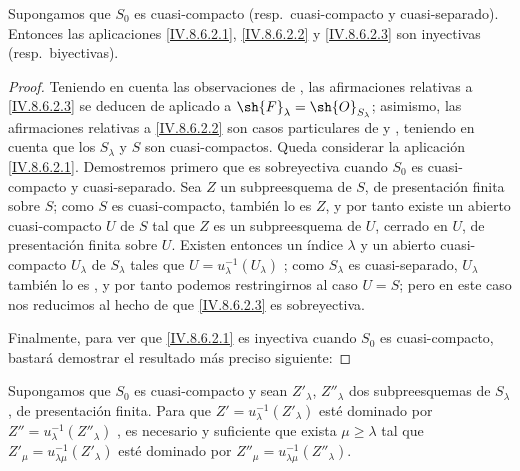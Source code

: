 \begin{proposition}[8.6.3]
\label{IV.8.6.3}
Supongamos que $S_0$ es cuasi-compacto (resp.\ cuasi-compacto y cuasi-separado).
Entonces las aplicaciones \eqref{IV.8.6.2.1}, \eqref{IV.8.6.2.2} y \eqref{IV.8.6.2.3} son inyectivas (resp.\ biyectivas).
\end{proposition}

\begin{proof}
Teniendo en cuenta las observaciones de , las afirmaciones relativas a \eqref{IV.8.6.2.3} se deducen de  aplicado a $\sh{F}_\lambda=\sh{O}_{S_\lambda}$; asimismo, las afirmaciones relativas a \eqref{IV.8.6.2.2} son casos particulares de  y , teniendo en cuenta que los $S_\lambda$ y $S$ son cuasi-compactos.
Queda considerar la aplicación \eqref{IV.8.6.2.1}.
Demostremos primero que es sobreyectiva cuando $S_0$ es cuasi-compacto y cuasi-separado.
Sea $Z$ un subpreesquema de $S$, de presentación finita sobre $S$; como $S$ es cuasi-compacto, también lo es $Z$, y por tanto existe un abierto cuasi-compacto $U$ de $S$ tal que $Z$ es un subpreesquema de $U$, cerrado en $U$, de presentación finita sobre $U$.
Existen entonces un índice $\lambda$ y un abierto cuasi-compacto $U_\lambda$ de $S_\lambda$ tales que $U=u_\lambda^{-1}(U_\lambda)$ ; como $S_\lambda$ es cuasi-separado, $U_\lambda$ también lo es , y por tanto podemos restringirnos al caso $U=S$; pero en este caso nos reducimos al hecho de que \eqref{IV.8.6.2.3} es sobreyectiva.

Finalmente, para ver que \eqref{IV.8.6.2.1} es inyectiva cuando $S_0$ es cuasi-compacto, bastará demostrar el resultado más preciso siguiente:
\end{proof}

\begin{corollary}[8.6.3.1]
\label{IV.8.6.3.1}
Supongamos que $S_0$ es cuasi-compacto y sean $Z'_\lambda$, $Z''_\lambda$ dos subpreesquemas de $S_\lambda$, de presentación finita.
Para que $Z'=u_\lambda^{-1}(Z'_\lambda)$ esté dominado por $Z''=u_\lambda^{-1}(Z''_\lambda)$ , es necesario y suficiente que exista $\mu\geqslant\lambda$ tal que $Z'_\mu=u_{\lambda\mu}^{-1}(Z'_\lambda)$ esté dominado por $Z''_\mu=u_{\lambda\mu}^{-1}(Z''_\lambda)$.
\end{corollary}

